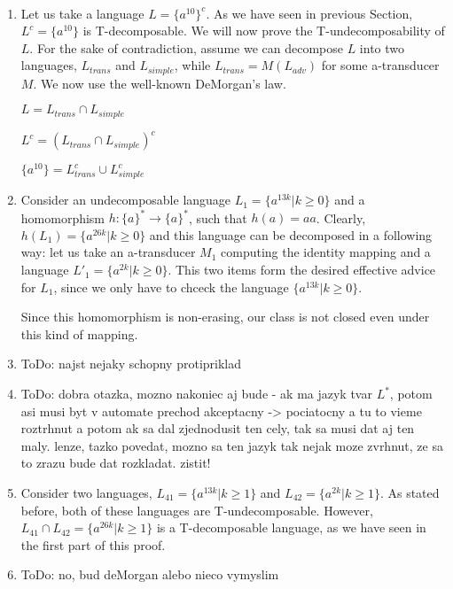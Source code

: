 \paragraph{}
\dokaz
\begin{enumerate}
\item Let us take a language $L = \{a^{10}\}^c$. As we have seen in previous Section, $L^c = \{a^{10}\}$ is T-decomposable. We will now prove the T-undecomposability of $L$. For the sake of contradiction, assume we can decompose $L$ into two languages, $L_{trans}$ and $L_{simple}$, while $L_{trans} = M(L_{adv})$ for some a-transducer $M$. We now use the well-known DeMorgan's law. \\
\centerline{$ L = L_{trans} \cap L_{simple}$}
\centerline{$ L^c = (L_{trans} \cap L_{simple})^c$}
\centerline{$ \{a^{10}\} = L_{trans}^c \cup L_{simple}^c$}

\item Consider an undecomposable language $L_1 = \{ a^{13k} | k \geq 0 \}$ and a homomorphism $h:\{ a\}^* \to \{ a \}^*$, such that $h(a) = aa$. Clearly, $h(L_1) = \{ a^{26k} | k \geq 0 \}$ and this language can be decomposed in a following way: let us take an a-transducer $M_1$ computing the identity mapping and a language $L'_1 = \{ a^{2k} | k \geq 0 \}$. This two items form the desired effective advice for $L_1$, since we only have to chceck the language $\{ a^{13k} | k \geq 0 \}$.

Since this homomorphism is non-erasing, our class is not closed even under this kind of mapping.

\item \color{red}ToDo: najst nejaky schopny protipriklad\color{black}

\item \color{red}ToDo: dobra otazka, mozno nakoniec aj bude - ak ma jazyk  tvar $L^*$, potom asi musi byt v automate prechod akceptacny -> pociatocny a tu to vieme roztrhnut a potom ak sa dal zjednodusit ten cely, tak sa musi dat aj ten maly. lenze, tazko povedat, mozno sa ten jazyk tak nejak moze zvrhnut, ze sa to zrazu bude dat rozkladat. zistit!\color{black}

\item Consider two languages, $L_{41} = \{ a^{13k} | k \geq 1 \}$ and $L_{42} = \{ a^{2k} | k \geq 1 \}$. As stated before, both of these languages are T-undecomposable. However, $L_{41} \cap L_{42} = \{ a^{26k} | k \geq 1 \}$ is a T-decomposable language, as we have seen in the first part of this proof.

\item \color{red}ToDo: no, bud deMorgan alebo nieco vymyslim\color{black}
\end{enumerate}

